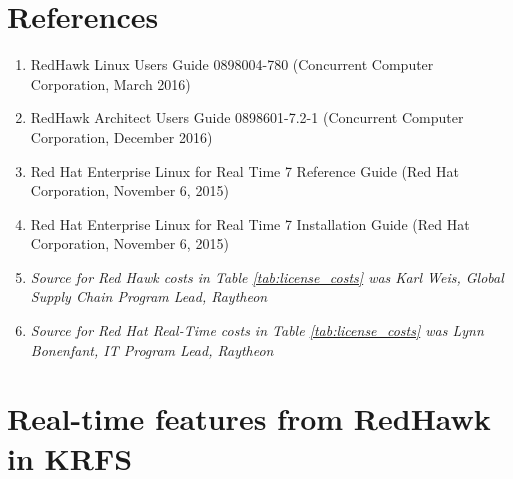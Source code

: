 \documentclass[12pt]{article}
\begin{document}
%
\section{References}

\begin{enumerate}
    \item RedHawk Linux Users Guide 0898004-780 (Concurrent Computer Corporation, March 2016) \label{ref:red_hawk_guide}
    \item RedHawk Architect Users Guide 0898601-7.2-1 (Concurrent Computer Corporation, December 2016) \label{ref:architect}
    \item Red Hat Enterprise Linux for Real Time 7 Reference Guide (Red Hat Corporation, November 6, 2015) \label{ref:architect}
    \item Red Hat Enterprise Linux for Real Time 7 Installation Guide (Red Hat Corporation, November 6, 2015) \label{ref:architect}
    \item \textit{Source for Red Hawk costs in Table \ref{tab:license_costs} was Karl Weis, Global Supply Chain Program Lead, Raytheon}
    \item \textit{Source for Red Hat Real-Time costs in Table \ref{tab:license_costs} was Lynn Bonenfant, IT Program Lead, Raytheon}
\end{enumerate}


%
\section{Real-time features from RedHawk in KRFS}
\label{sec:redhawk_features}
\end{document}
